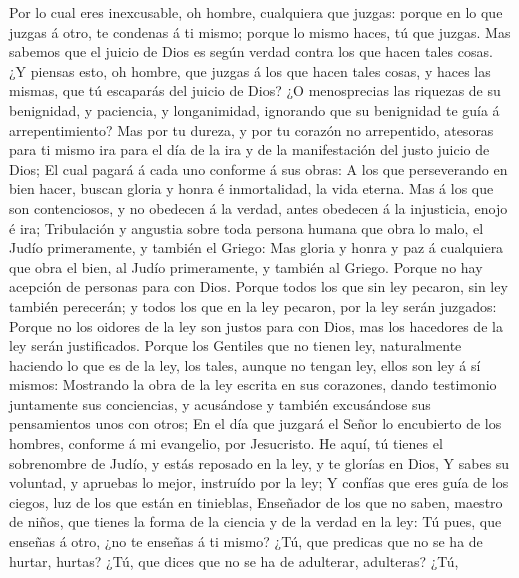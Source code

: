  Por lo cual eres inexcusable, oh hombre, cualquiera que
juzgas: porque en lo que juzgas á otro, te condenas á ti mismo; porque
lo mismo haces, tú que juzgas.  Mas sabemos que el juicio de
Dios es según verdad contra los que hacen tales cosas.  ¿Y
piensas esto, oh hombre, que juzgas á los que hacen tales cosas, y haces
las mismas, que tú escaparás del juicio de Dios?  ¿O
menosprecias las riquezas de su benignidad, y paciencia, y longanimidad,
ignorando que su benignidad te guía á arrepentimiento?  Mas
por tu dureza, y por tu corazón no arrepentido, atesoras para ti mismo
ira para el día de la ira y de la manifestación del justo juicio de
Dios;  El cual pagará á cada uno conforme á sus obras:
 A los que perseverando en bien hacer, buscan gloria y honra
é inmortalidad, la vida eterna.  Mas á los que son
contenciosos, y no obedecen á la verdad, antes obedecen á la injusticia,
enojo é ira;  Tribulación y angustia sobre toda persona
humana que obra lo malo, el Judío primeramente, y también el Griego:
 Mas gloria y honra y paz á cualquiera que obra el bien, al
Judío primeramente, y también al Griego.  Porque no hay
acepción de personas para con Dios.  Porque todos los que
sin ley pecaron, sin ley también perecerán; y todos los que en la ley
pecaron, por la ley serán juzgados:  Porque no los oidores
de la ley son justos para con Dios, mas los hacedores de la ley serán
justificados.  Porque los Gentiles que no tienen ley,
naturalmente haciendo lo que es de la ley, los tales, aunque no tengan
ley, ellos son ley á sí mismos:  Mostrando la obra de la
ley escrita en sus corazones, dando testimonio juntamente sus
conciencias, y acusándose y también excusándose sus pensamientos unos
con otros;  En el día que juzgará el Señor lo encubierto de
los hombres, conforme á mi evangelio, por Jesucristo.  He
aquí, tú tienes el sobrenombre de Judío, y estás reposado en la ley, y
te glorías en Dios,  Y sabes su voluntad, y apruebas lo
mejor, instruído por la ley;  Y confías que eres guía de
los ciegos, luz de los que están en tinieblas,  Enseñador
de los que no saben, maestro de niños, que tienes la forma de la ciencia
y de la verdad en la ley:  Tú pues, que enseñas á otro, ¿no
te enseñas á ti mismo? ¿Tú, que predicas que no se ha de hurtar, hurtas?
 ¿Tú, que dices que no se ha de adulterar, adulteras? ¿Tú,
